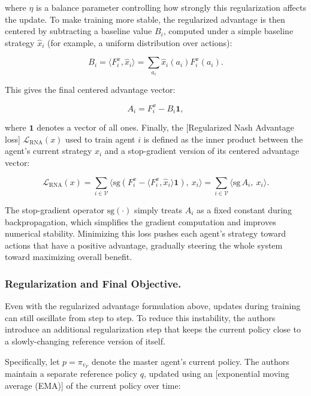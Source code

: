 \documentclass[manuscript,review]{acmart}
\begin{document}
where $\eta$ is a balance parameter controlling how strongly this regularization affects
the update. To make training more stable, the regularized advantage is then centered by
subtracting a baseline value $B_i$, computed under a simple baseline strategy $\hat{x}_i$
(for example, a uniform distribution over actions):

\begin{equation}
B_i = \langle F_i^x, \hat{x}_i \rangle = \sum_{a_i} \hat{x}_i(a_i) F_i^x(a_i).
\end{equation}

This gives the final centered advantage vector:

\begin{equation}
A_i = F_i^x - B_i \mathbf{1},
\end{equation}

where $\mathbf{1}$ denotes a vector of all ones. Finally, the [Regularized Nash Advantage
loss] $\mathcal{L}_{\text{RNA}}(x)$ used to train agent $i$ is defined as the inner
product between the agent's current strategy $x_i$ and a stop-gradient version of its
centered advantage vector:

\begin{equation}
\mathcal{L}_{\text{RNA}}(x) = \sum_{i \in \mathcal{V}} \big\langle \text{sg}(F_i^x - \langle F_i^x, \hat{x}_i \rangle \mathbf{1}),\ x_i \big\rangle
= \sum_{i \in \mathcal{V}} \langle \text{sg}\, A_i,\ x_i \rangle.
\end{equation}

The stop-gradient operator $\text{sg}(\cdot)$ simply treats $A_i$ as a fixed constant
during backpropagation, which simplifies the gradient computation and improves numerical
stability. Minimizing this loss pushes each agent's strategy toward actions that have a
positive advantage, gradually steering the whole system toward maximizing overall
benefit.

\subsubsection{\textbf{Regularization and Final Objective.} \newline}

Even with the regularized advantage formulation above, updates during training can still
oscillate from step to step. To reduce this instability, the authors introduce an
additional regularization step that keeps the current policy close to a slowly-changing
reference version of itself.

Specifically, let $p = \pi_{v_F}$ denote the master agent's current policy. The authors
maintain a separate reference policy $q$, updated using an [exponential moving average
(EMA)] of the current policy over time:
\end{document}
